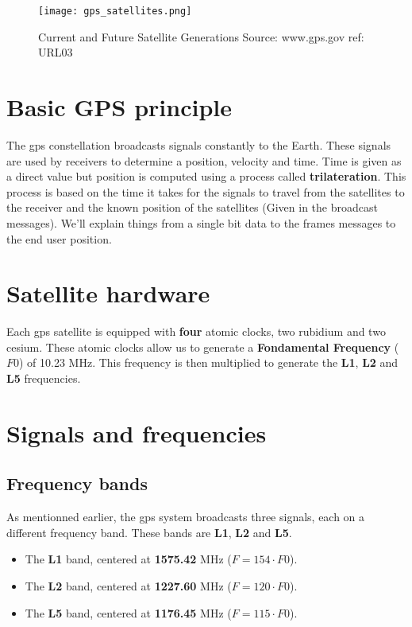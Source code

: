 \begin{figure}[H]
	\centering
	\texttt{[image: gps\_satellites.png]}
	\caption[GPS Satellites generations]{Current and Future Satellite Generations Source: www.gps.gov ref: URL03}
	\label{fig:gps_satellites}
\end{figure}

\pagebreak

\section{Basic GPS principle}

The \gls{gps} constellation broadcasts signals constantly to the Earth. These signals are used by receivers to determine a position, velocity and time. Time is given as a direct value but position is computed using a process called \textbf{trilateration}. This process is based on the time it takes for the signals to travel from the satellites to the receiver and the known position of the satellites (Given in the broadcast messages). We'll explain things from a single bit data to the frames messages to the end user position.


\section{Satellite hardware}

Each \gls{gps} satellite is equipped with \textbf{four} atomic clocks, two rubidium and two cesium. These atomic clocks allow us to generate a \textbf{Fondamental Frequency} ($ F0 $) of 10.23 MHz. This frequency is then multiplied to generate the \textbf{L1}, \textbf{L2} and \textbf{L5} frequencies.


\section{Signals and frequencies}

\subsection{Frequency bands}

As mentionned earlier, the \gls{gps} system broadcasts three signals, each on a different frequency band. These bands are \textbf{L1}, \textbf{L2} and \textbf{L5}.
\begin{itemize}
	\item The \textbf{L1} band, centered at \textbf{1575.42} MHz ($F = 154 \cdot F0 $).
	\item The \textbf{L2} band, centered at \textbf{1227.60} MHz ($F = 120 \cdot F0 $).
	\item The \textbf{L5} band, centered at \textbf{1176.45} MHz ($F = 115 \cdot F0 $).
\end{itemize}

